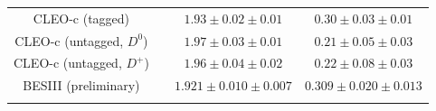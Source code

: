 \begin{table}[htbp]
\begin{center}
\begin{tabular}{cccc}
 CLEO-c (tagged)   &\cite{Besson:2009uv}      & $1.93\pm0.02\pm0.01$                   & $0.30\pm0.03\pm0.01$     \\
 CLEO-c (untagged, $D^0$) &\cite{Dobbs:2007aa}       & $1.97 \pm0.03 \pm 0.01 $ & $0.21 \pm 0.05 \pm 0.03 $  \\
 CLEO-c (untagged, $D^+$) &\cite{Dobbs:2007aa}       & $1.96 \pm0.04 \pm 0.02 $ & $0.22 \pm 0.08 \pm 0.03$  \\
  BESIII (preliminary)     &\cite{BESIII-new}                & $1.921 \pm 0.010 \pm 0.007$ & $ 0.309 \pm 0.020 \pm 0.013$   \\ %
\vspace*{-10pt} & \\
\hline
\end{tabular}
\end{center}
\end{table}
